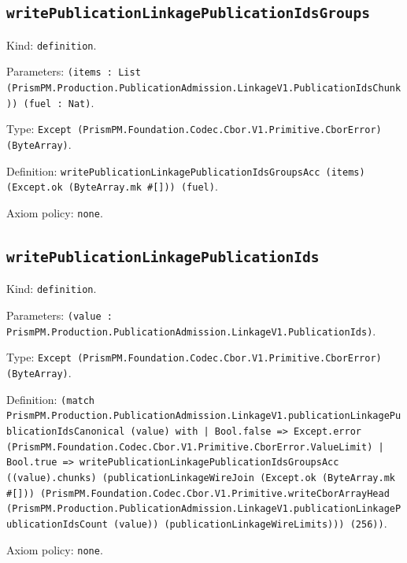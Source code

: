 \documentclass[11pt]{article}
\begin{document}
\subsection*{\texttt{writePublicationLinkagePublicationIdsGroups}}
\noindent Kind: \texttt{definition}.\par
\noindent Parameters: \texttt{(items : List (PrismPM.Production.PublicationAdmission.LinkageV1.PublicationIdsChunk)) (fuel : Nat)}.\par
\noindent Type: \texttt{Except (PrismPM.Foundation.Codec.Cbor.V1.Primitive.CborError) (ByteArray)}.\par
\noindent Definition: \texttt{writePublicationLinkagePublicationIdsGroupsAcc (items) (Except.ok (ByteArray.mk \#[])) (fuel)}.\par
\noindent Axiom policy: \texttt{none}.\par
\subsection*{\texttt{writePublicationLinkagePublicationIds}}
\noindent Kind: \texttt{definition}.\par
\noindent Parameters: \texttt{(value : PrismPM.Production.PublicationAdmission.LinkageV1.PublicationIds)}.\par
\noindent Type: \texttt{Except (PrismPM.Foundation.Codec.Cbor.V1.Primitive.CborError) (ByteArray)}.\par
\noindent Definition: \texttt{(match PrismPM.Production.PublicationAdmission.LinkageV1.publicationLinkagePublicationIdsCanonical (value) with | Bool.false => Except.error (PrismPM.Foundation.Codec.Cbor.V1.Primitive.CborError.ValueLimit) | Bool.true => writePublicationLinkagePublicationIdsGroupsAcc ((value).chunks) (publicationLinkageWireJoin (Except.ok (ByteArray.mk \#[])) (PrismPM.Foundation.Codec.Cbor.V1.Primitive.writeCborArrayHead (PrismPM.Production.PublicationAdmission.LinkageV1.publicationLinkagePublicationIdsCount (value)) (publicationLinkageWireLimits))) (256))}.\par
\noindent Axiom policy: \texttt{none}.\par
\end{document}
